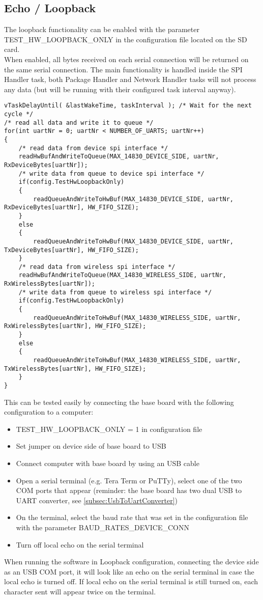 \subsection{Echo / Loopback} \label{subsec:txtTestLoopback}
The loopback functionality can be enabled with the parameter TEST\_HW\_LOOPBACK\_ONLY in the configuration file located on the SD card.\\
When enabled, all bytes received on each serial connection will be returned on the same serial connection. The main functionality is handled inside the SPI Handler task, both Package Handler and Network Handler tasks will not process any data (but will be running with their configured task interval anyway).
\begin{lstlisting}
vTaskDelayUntil( &lastWakeTime, taskInterval ); /* Wait for the next cycle */
/* read all data and write it to queue */
for(int uartNr = 0; uartNr < NUMBER_OF_UARTS; uartNr++)
{
    /* read data from device spi interface */
    readHwBufAndWriteToQueue(MAX_14830_DEVICE_SIDE, uartNr, RxDeviceBytes[uartNr]);
    /* write data from queue to device spi interface */
    if(config.TestHwLoopbackOnly)
    {
        readQueueAndWriteToHwBuf(MAX_14830_DEVICE_SIDE, uartNr, RxDeviceBytes[uartNr], HW_FIFO_SIZE);
    }
    else
    {
        readQueueAndWriteToHwBuf(MAX_14830_DEVICE_SIDE, uartNr, TxDeviceBytes[uartNr], HW_FIFO_SIZE);
    }
    /* read data from wireless spi interface */
    readHwBufAndWriteToQueue(MAX_14830_WIRELESS_SIDE, uartNr, RxWirelessBytes[uartNr]);
    /* write data from queue to wireless spi interface */
    if(config.TestHwLoopbackOnly)
    {
        readQueueAndWriteToHwBuf(MAX_14830_WIRELESS_SIDE, uartNr, RxWirelessBytes[uartNr], HW_FIFO_SIZE);
    }
    else
    {
        readQueueAndWriteToHwBuf(MAX_14830_WIRELESS_SIDE, uartNr, TxWirelessBytes[uartNr], HW_FIFO_SIZE);
    }
}
\end{lstlisting}
This can be tested easily by connecting the base board with the following configuration to a computer:
\begin{itemize}
    \item TEST\_HW\_LOOPBACK\_ONLY = 1 in configuration file
    \item Set jumper on device side of base board to USB
    \item Connect computer with base board by using an USB cable
    \item Open a serial terminal (e.g. Tera Term or PuTTy), select one of the two COM ports that appear (reminder: the base board has two dual USB to UART converter, see \autoref{subsec:UsbToUartConverter})
    \item On the terminal, select the baud rate that was set in the configuration file with the parameter BAUD\_RATES\_DEVICE\_CONN
    \item Turn off local echo on the serial terminal
\end{itemize}
When running the software in Loopback configuration, connecting the device side as an USB COM port, it will look like an echo on the serial terminal in case the local echo is turned off. If local echo on the serial terminal is still turned on, each character sent will appear twice on the terminal.
%
%
